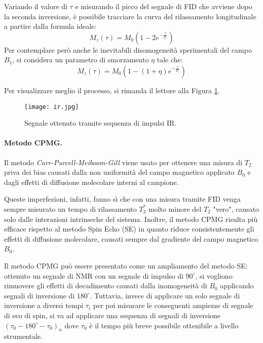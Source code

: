 Variando il valore di $\tau$ e misurando il picco del segnale di FID che avviene dopo la seconda inversione, è possibile tracciare la curva del rilassamento longitudinale a partire dalla formula ideale:
\begin{equation}
	M_z(\tau)=M_0\left(1 - 2e^{-\frac{\tau}{T_1}}\right)
\end{equation}
Per contemplare però anche le inevitabili disomogeneità sperimentali del campo $B_1$, si considera un parametro di smorzamento $\eta$ tale che:
\begin{equation}
	M_z(\tau)=M_0\left(1 - (1+\eta)e^{-\frac{\tau}{T_1}}\right)
\end{equation}

Per visualizzare meglio il processo, si rimanda il lettore alla Figura \ref{fig:ir}.

\begin{figure}
\centering
\texttt{[image: ir.jpg]}
\caption{Segnale ottenuto tramite sequenza di impulsi IR.}
\label{fig:ir}
\end{figure}

\paragraph{Metodo CPMG.}

Il metodo \textit{Carr-Purcell-Meiboom-Gill} viene usato per ottenere una misura di $T_2$ priva dei bias causati dalla non uniformità del campo magnetico applicato $B_0$ e dagli effetti di diffusione molecolare interni al campione.

Queste imperfezioni, infatti, fanno sì che con una misura tramite FID venga sempre misurato un tempo di rilassamento $T_2^*$ molto minore del $T_2$ "vero", causato solo dalle interazioni intrinseche del sistema. Inoltre, il metodo CPMG risulta più efficace rispetto al metodo Spin Echo (SE) in quanto riduce consistentemente gli effetti di diffusione molecolare, causati sempre dal gradiente del campo magnetico $B_0$.

Il metodo CPMG può essere presentato come un ampliamento del metodo SE: ottenuto un segnale di NMR con un segnale di impulso di $90^\circ$, si vogliono rimuovere gli effetti di decadimento causati dalla inomogeneità di $B_0$ applicando segnali di inversione di $180^\circ$. Tuttavia, invece di applicare un solo segnale di inversione a diversi tempi $\tau_i$ per poi misurare le conseguenti ampiezze di segnale di eco di spin, si va ad applicare una sequenza di segnali di inversione $(\tau_0 - 180^\circ - \tau_0)_n$ dove $\tau_0$ è il tempo più breve possibile ottenibile a livello strumentale.\\

